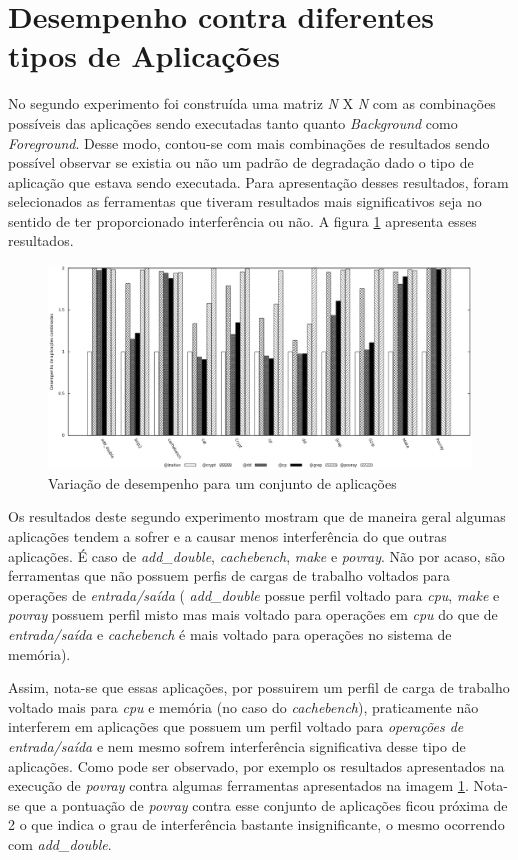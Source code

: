 \section{Desempenho contra diferentes tipos de Aplicações}
No segundo experimento foi construída uma matriz  \textit{N} X \textit{N} com as combinações possíveis das aplicações sendo executadas tanto quanto \textit{Background } como \textit{Foreground}. Desse modo, contou-se com mais combinações de resultados sendo possível observar se existia ou não um padrão de degradação dado o tipo de aplicação que estava sendo executada. Para apresentação desses resultados, foram selecionados as ferramentas que tiveram resultados mais significativos seja no sentido de ter proporcionado interferência ou não. A figura \ref{second_experiment} apresenta esses resultados.

\begin{figure}[!h]
\centering
\includegraphics [keepaspectratio=true,scale=0.5]{graficos/exp2.eps}
\caption{Variação de desempenho para um conjunto de aplicações}
\label{second_experiment}
\end{figure} 

Os resultados deste segundo experimento mostram que de maneira geral algumas aplicações tendem a sofrer e a causar menos interferência do que outras aplicações. É caso de \textit{add\_double}, \textit{cachebench}, \textit{make} e \textit{povray}. Não por acaso, são ferramentas que não possuem perfis de cargas de trabalho voltados para operações de \textit{entrada/saída} ( \textit{add\_double} possue perfil voltado para \textit{cpu}, \textit{make} e \textit{povray} possuem perfil misto mas mais voltado para operações em \textit{cpu} do que de \textit{entrada/saída} e \textit{cachebench} é mais voltado para operações no sistema de memória). 

Assim, nota-se que essas aplicações, por possuirem um perfil de carga de trabalho voltado mais para \textit{cpu} e memória (no caso do \textit{cachebench}), praticamente não interferem em aplicações que possuem um perfil voltado para \textit{operações de entrada/saída} e nem mesmo sofrem interferência significativa desse tipo de aplicações. Como pode ser observado, por exemplo os resultados apresentados na execução de \textit{povray} contra algumas ferramentas apresentados na imagem \ref{second_experiment}. Nota-se que a pontuação de \textit{povray} contra esse conjunto de aplicações ficou próxima de 2 o que indica o grau de interferência bastante insignificante, o mesmo ocorrendo com \textit{add\_double}.

